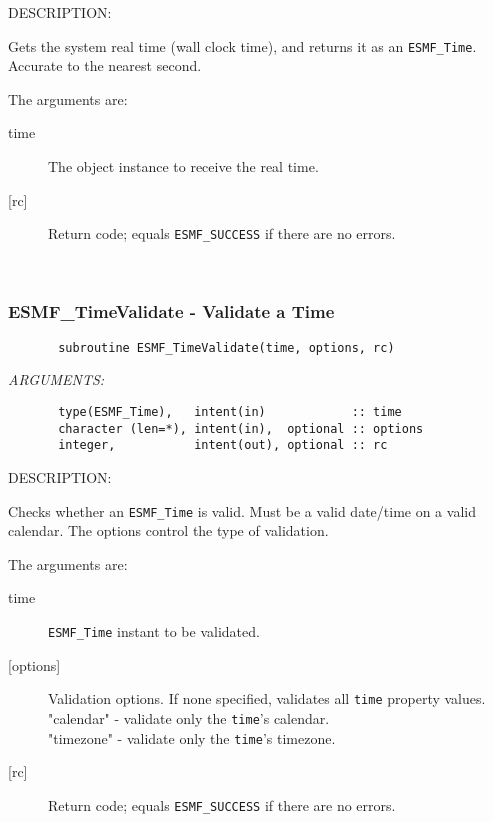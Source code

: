 {\sf DESCRIPTION:\\ }


       Gets the system real time (wall clock time), and returns it as an
       {\tt ESMF\_Time}.  Accurate to the nearest second.
  
       The arguments are:
       \begin{description}
       \item[time]
            The object instance to receive the real time.
       \item[{[rc]}]
            Return code; equals {\tt ESMF\_SUCCESS} if there are no errors.
       \end{description}
   
 
\mbox{}\hrulefill\ 
 
\subsubsection [ESMF\_TimeValidate] {ESMF\_TimeValidate - Validate a Time}


 
\begin{verbatim}       subroutine ESMF_TimeValidate(time, options, rc)
 \end{verbatim}{\em ARGUMENTS:}
\begin{verbatim}       type(ESMF_Time),   intent(in)            :: time
       character (len=*), intent(in),  optional :: options
       integer,           intent(out), optional :: rc
 \end{verbatim}
{\sf DESCRIPTION:\\ }


       Checks whether an {\tt ESMF\_Time} is valid.
       Must be a valid date/time on a valid calendar.
       The options control the type of validation.
  
       The arguments are:
       \begin{description}
       \item[time]
            {\tt ESMF\_Time} instant to be validated.
       \item[{[options]}]
            Validation options. If none specified, validates all {\tt time} property
              values. \\
            "calendar" - validate only the {\tt time}'s calendar. \\
            "timezone" - validate only the {\tt time}'s timezone. \\
       \item[{[rc]}]
            Return code; equals {\tt ESMF\_SUCCESS} if there are no errors.
       \end{description}
  
\setlength{\parskip}{\oldparskip}
\setlength{\parindent}{\oldparindent}
\setlength{\baselineskip}{\oldbaselineskip}
